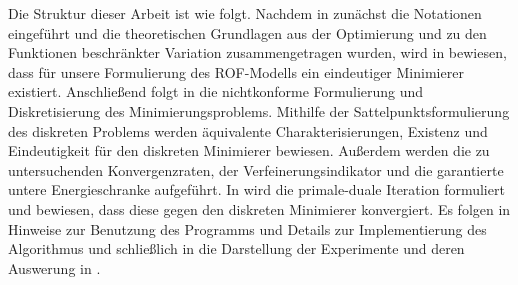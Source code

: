 Die Struktur dieser Arbeit ist wie folgt.
Nachdem in  zunächst die Notationen eingeführt und
die theoretischen Grundlagen aus der Optimierung und zu den Funktionen
beschränkter Variation zusammengetragen wurden, wird in
 bewiesen, dass für unsere Formulierung des
ROF-Modells ein eindeutiger Minimierer existiert.
Anschließend folgt in  die nichtkonforme
Formulierung und Diskretisierung des Minimierungsproblems. 
Mithilfe der Sattelpunktsformulierung des diskreten Problems werden äquivalente
Charakterisierungen, Existenz und Eindeutigkeit für den diskreten Minimierer
bewiesen. Außerdem werden die zu untersuchenden Konvergenzraten, der
Verfeinerungsindikator und die garantierte untere Energieschranke aufgeführt.
In  wird die primale-duale Iteration formuliert und
bewiesen, dass diese gegen den diskreten Minimierer konvergiert. 
Es folgen in  Hinweise zur Benutzung des Programms
und Details zur Implementierung des Algorithmus und schließlich in
 die Darstellung der Experimente und deren Auswerung in
.

